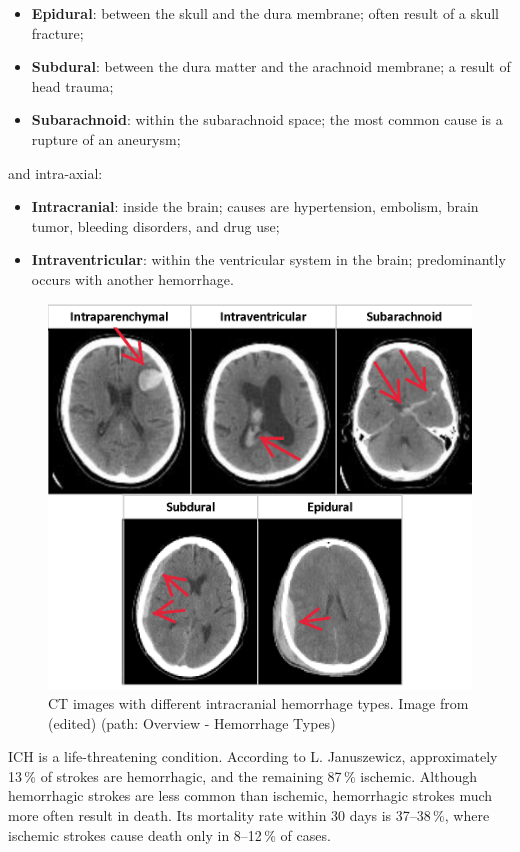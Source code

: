 \documentclass[thesis=B,english]{FITthesis}[2019/12/23]
\begin{document}
\begin{itemize}
	\item \textbf{Epidural}: between the skull and the dura membrane; often result of a skull fracture;
	\item \textbf{Subdural}: between the dura matter and the arachnoid membrane; a result of head trauma;
	\item \textbf{Subarachnoid}: within the subarachnoid space; the most common cause is a rupture of an aneurysm;
\end{itemize}
and intra-axial:
\begin{itemize}
	\item \textbf{Intracranial}:  inside the brain; causes are hypertension, embolism, brain tumor, bleeding disorders, and drug use;
	\item \textbf{Intraventricular}: within the ventricular system in the brain; predominantly occurs with another hemorrhage.\cite{naidich2012imaging}
\end{itemize}

\begin{figure}[ht]
		\includegraphics[scale=0.9]{images/ich-types.png}
		\centering
		\caption{CT images with different intracranial hemorrhage types. Image from \cite{kaggle_competition} (edited) (path: Overview - Hemorrhage Types)}
\end{figure}

ICH is a life-threatening condition. According to L. Januszewicz\cite{urden2019priorities}, approximately 13\,\% of strokes are hemorrhagic, and the remaining 87\,\% ischemic. Although hemorrhagic strokes are less common than ischemic, hemorrhagic strokes much more often result in death. Its mortality rate within 30 days is 37--38\,\%, where ischemic strokes cause death only in 8--12\,\% of cases.
\end{document}
